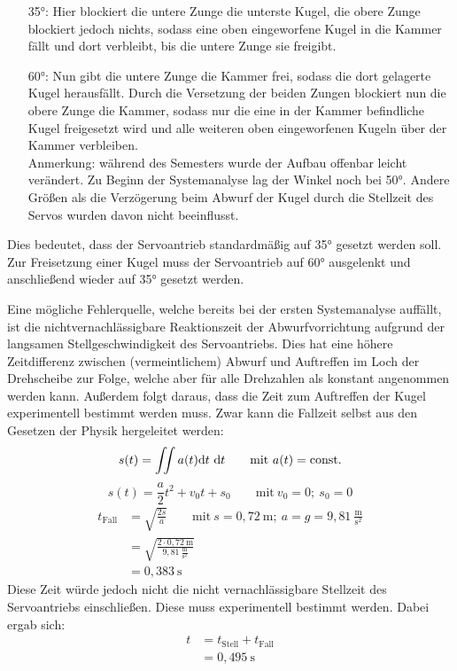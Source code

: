 \documentclass{kis}
\begin{document}
\begin{itemize}
\item[35°:] Hier blockiert die untere Zunge die unterste Kugel, die obere Zunge blockiert jedoch nichts, sodass eine oben eingeworfene Kugel in die Kammer fällt und dort verbleibt, bis die untere Zunge sie freigibt.
\item[60°:] Nun gibt die untere Zunge die Kammer frei, sodass die dort gelagerte Kugel herausfällt. Durch die Versetzung der beiden Zungen blockiert nun die obere Zunge die Kammer, sodass nur die eine in der Kammer befindliche Kugel freigesetzt wird und alle weiteren oben eingeworfenen Kugeln über der Kammer verbleiben.\\
Anmerkung: während des Semesters wurde der Aufbau offenbar leicht verändert. Zu Beginn der Systemanalyse lag der Winkel noch bei 50°. Andere Größen als die Verzögerung beim Abwurf der Kugel durch die Stellzeit des Servos wurden davon nicht beeinflusst.
\end{itemize}

Dies bedeutet, dass der Servoantrieb standardmäßig auf 35° gesetzt werden soll. Zur Freisetzung einer Kugel muss der Servoantrieb auf 60° ausgelenkt und anschließend wieder auf 35° gesetzt werden.

Eine mögliche Fehlerquelle, welche bereits bei der ersten Systemanalyse auffällt, ist die nichtvernachlässigbare Reaktionszeit der Abwurfvorrichtung aufgrund der langsamen Stellgeschwindigkeit des Servoantriebs. Dies hat eine höhere Zeitdifferenz zwischen (vermeintlichem) Abwurf und Auftreffen im Loch der Drehscheibe zur Folge, welche aber für alle Drehzahlen als konstant angenommen werden kann. Außerdem folgt daraus, dass die Zeit zum Auftreffen der Kugel experimentell bestimmt werden muss. Zwar kann die Fallzeit selbst aus den Gesetzen der Physik hergeleitet werden:
$$s(t) = \iint a(t) \text dt~\text dt\qquad\text{mit}~a(t) = \text{const.}$$
$$s(t) = \frac a2t^2+v_0t+s_0\qquad\text{mit}~v_0=0;~ s_0=0$$
\begin{align*}t_\text{Fall} &= \sqrt{\frac{2s}{a}}\qquad \text{mit}~s=0,72~\text{m};~ a=g=9,81~\frac{\text{m}}{\text{s}^2}\\
&= \sqrt{\frac{2\cdot0,72~\text{m}}{9,81~\frac{\text{m}}{\text{s}^2}}}\\
&= 0,383~\text{s}\end{align*}
Diese Zeit würde jedoch nicht die nicht vernachlässigbare Stellzeit des Servoantriebs einschließen. Diese muss experimentell bestimmt werden. Dabei ergab sich:
\begin{align*}t &= t_\text{Stell} + t_\text{Fall}\\
&= 0,495~\text{s}\end{align*}
\end{document}
